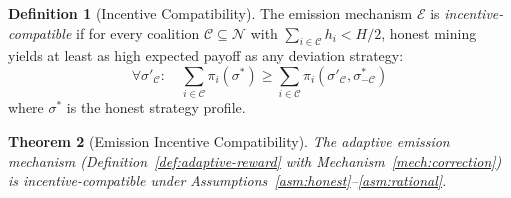 \documentclass[11pt,a4paper]{article}
\newtheorem{theorem}{Theorem}[section]
\theoremstyle{definition}
\newtheorem{definition}[theorem]{Definition}
\theoremstyle{remark}
\newcommand{\payoff}{\pi}
\newcommand{\strategy}{\sigma}
\newcommand{\Players}{\mathcal{N}}
\newcommand{\hashrate}{h}
\newcommand{\Hashrate}{H}
\newcommand{\emission}{\mathcal{E}}
\begin{document}
\begin{definition}[Incentive Compatibility]\label{def:ic}
The emission mechanism $\emission$ is \emph{incentive-compatible} if
for every coalition $\mathcal{C} \subseteq \Players$ with
$\sum_{i \in \mathcal{C}} \hashrate_i < \Hashrate / 2$, honest mining
yields at least as high expected payoff as any deviation strategy:
\[
  \forall \strategy'_{\mathcal{C}}: \quad
  \sum_{i \in \mathcal{C}} \payoff_i(\strategy^*) \geq
  \sum_{i \in \mathcal{C}} \payoff_i(\strategy'_{\mathcal{C}},
  \strategy^*_{-\mathcal{C}})
\]
where $\strategy^*$ is the honest strategy profile.
\end{definition}

\begin{theorem}[Emission Incentive Compatibility]\label{thm:ic-emission}
The adaptive emission mechanism (Definition~\ref{def:adaptive-reward}
with Mechanism~\ref{mech:correction}) is incentive-compatible under
Assumptions~\ref{asm:honest}--\ref{asm:rational}.
\end{theorem}
\end{document}
